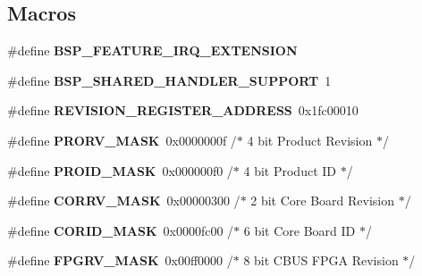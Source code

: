 \subsection*{Macros}
\begin{DoxyCompactItemize}
\item 
\mbox{\label{group__RTEMSBSPsMIPSMalta_ga5d7d631d3a14b7554160f14eb42f351b}} 
\#define {\bfseries B\+S\+P\+\_\+\+F\+E\+A\+T\+U\+R\+E\+\_\+\+I\+R\+Q\+\_\+\+E\+X\+T\+E\+N\+S\+I\+ON}
\item 
\mbox{\label{group__RTEMSBSPsMIPSMalta_ga2fe5e739729e5756a04cc73da64cc8ee}} 
\#define {\bfseries B\+S\+P\+\_\+\+S\+H\+A\+R\+E\+D\+\_\+\+H\+A\+N\+D\+L\+E\+R\+\_\+\+S\+U\+P\+P\+O\+RT}~1
\item 
\mbox{\label{group__RTEMSBSPsMIPSMalta_ga7b3aa3f98e76e74542d8b38f88f6697c}} 
\#define {\bfseries R\+E\+V\+I\+S\+I\+O\+N\+\_\+\+R\+E\+G\+I\+S\+T\+E\+R\+\_\+\+A\+D\+D\+R\+E\+SS}~0x1fc00010
\item 
\mbox{\label{group__RTEMSBSPsMIPSMalta_ga21afa8777f10d9e5fe9a6568b3410568}} 
\#define {\bfseries P\+R\+O\+R\+V\+\_\+\+M\+A\+SK}~0x0000000f   /$\ast$ 4 bit Product Revision $\ast$/
\item 
\mbox{\label{group__RTEMSBSPsMIPSMalta_ga6eb8f96a3a01c1a7d75a8dc4721ff3cc}} 
\#define {\bfseries P\+R\+O\+I\+D\+\_\+\+M\+A\+SK}~0x000000f0   /$\ast$ 4 bit Product I\+D $\ast$/
\item 
\mbox{\label{group__RTEMSBSPsMIPSMalta_gad759671c2132dce8c006258963bbda76}} 
\#define {\bfseries C\+O\+R\+R\+V\+\_\+\+M\+A\+SK}~0x00000300   /$\ast$ 2 bit Core Board Revision $\ast$/
\item 
\mbox{\label{group__RTEMSBSPsMIPSMalta_ga893acca25131bbce02fc654937569cf8}} 
\#define {\bfseries C\+O\+R\+I\+D\+\_\+\+M\+A\+SK}~0x0000fc00   /$\ast$ 6 bit Core Board I\+D $\ast$/
\item 
\mbox{\label{group__RTEMSBSPsMIPSMalta_gaa03ae3997ee414ee747af69491cd5517}} 
\#define {\bfseries F\+P\+G\+R\+V\+\_\+\+M\+A\+SK}~0x00ff0000   /$\ast$ 8 bit C\+B\+U\+S F\+P\+G\+A Revision $\ast$/

\end{DoxyCompactItemize}

